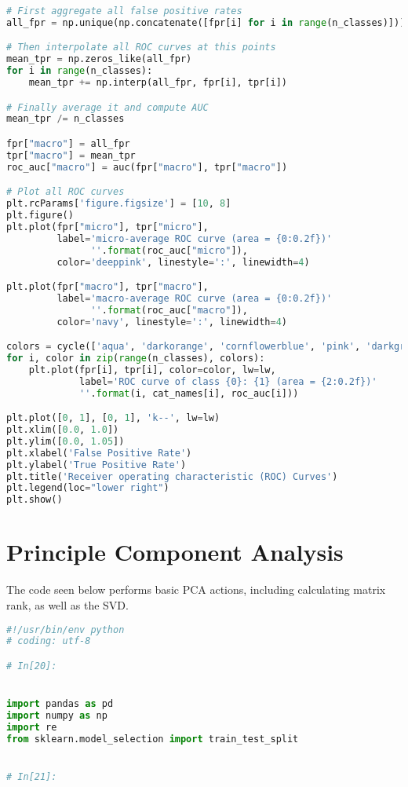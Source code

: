 \documentclass[12pt,letterpaper,oneside,reqno]{book}
\theoremstyle{plain}
\theoremstyle{definition}
\theoremstyle{plain}
\theoremstyle{remark}
\theoremstyle{plain}
\theoremstyle{definition}
\theoremstyle{plain}
\begin{document}
\begin{appendices}
\begin{lstlisting}[language=Python, label=lst:7classdcnnfull, frame=single]
# First aggregate all false positive rates
all_fpr = np.unique(np.concatenate([fpr[i] for i in range(n_classes)]))

# Then interpolate all ROC curves at this points
mean_tpr = np.zeros_like(all_fpr)
for i in range(n_classes):
    mean_tpr += np.interp(all_fpr, fpr[i], tpr[i])

# Finally average it and compute AUC
mean_tpr /= n_classes

fpr["macro"] = all_fpr
tpr["macro"] = mean_tpr
roc_auc["macro"] = auc(fpr["macro"], tpr["macro"])

# Plot all ROC curves
plt.rcParams['figure.figsize'] = [10, 8]
plt.figure()
plt.plot(fpr["micro"], tpr["micro"],
         label='micro-average ROC curve (area = {0:0.2f})'
               ''.format(roc_auc["micro"]),
         color='deeppink', linestyle=':', linewidth=4)

plt.plot(fpr["macro"], tpr["macro"],
         label='macro-average ROC curve (area = {0:0.2f})'
               ''.format(roc_auc["macro"]),
         color='navy', linestyle=':', linewidth=4)

colors = cycle(['aqua', 'darkorange', 'cornflowerblue', 'pink', 'darkgreen', 'maroon', 'olive'])
for i, color in zip(range(n_classes), colors):
    plt.plot(fpr[i], tpr[i], color=color, lw=lw,
             label='ROC curve of class {0}: {1} (area = {2:0.2f})'
             ''.format(i, cat_names[i], roc_auc[i]))

plt.plot([0, 1], [0, 1], 'k--', lw=lw)
plt.xlim([0.0, 1.0])
plt.ylim([0.0, 1.05])
plt.xlabel('False Positive Rate')
plt.ylabel('True Positive Rate')
plt.title('Receiver operating characteristic (ROC) Curves')
plt.legend(loc="lower right")
plt.show()


\end{lstlisting}

\section{Principle Component Analysis}
The code seen below performs basic PCA actions, including calculating matrix rank, as well as the SVD.
\begin{lstlisting}[language=Python, label=lst:pcafull, frame=single]
#!/usr/bin/env python
# coding: utf-8

# In[20]:


import pandas as pd
import numpy as np
import re
from sklearn.model_selection import train_test_split


# In[21]:



\end{lstlisting}
\end{appendices}
\end{document}
